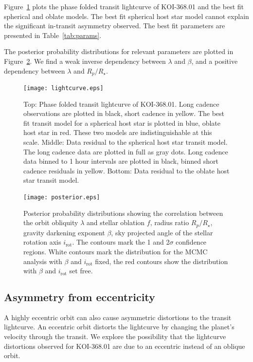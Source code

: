 \documentclass[apjl]{emulateapj}
\begin{document}
Figure~\ref{fig:lightcurve} plots the phase folded transit lightcurve of
KOI-368.01 and the best fit spherical and oblate models. The best fit
spherical host star model cannot explain the significant in-transit
asymmetry observed. The best fit parameters are presented in Table~\ref{tab:params}.

The posterior probability distributions for relevant parameters
are plotted in Figure~\ref{fig:posterior}. We find a weak inverse dependency
between $\lambda$ and $\beta$, and a positive dependency between
$\lambda$ and $R_p/R_\star$.



\begin{figure}[h!]
  \centering
  \texttt{[image: lightcurve.eps]}
  \caption{Top: Phase folded transit lightcurve of KOI-368.01. Long
    cadence observations are plotted in black, short cadence in
    yellow. The best fit transit model for a spherical host star is
    plotted in blue, oblate host star in red. These two models are
    indistinguishable at this scale. Middle: Data residual to the
    spherical host star transit model. The long cadence data are
    plotted in full as gray dots. Long cadence data binned to 1 hour
    intervals are plotted in black, binned short cadence residuals in yellow. Bottom:
    Data residual to the oblate host star transit model.}
  \label{fig:lightcurve}
\end{figure}

\begin{figure}[h!]
  \centering
  \texttt{[image: posterior.eps]}
  \caption{Posterior probability distributions showing the correlation
  between the orbit obliquity $\lambda$ and stellar oblation $f$,
  radius ratio $R_p/R_\star$, gravity darkening exponent $\beta$, sky
  projected angle of the stellar rotation axis $i_\text{rot}$. The
  contours mark the 1 and 2$\sigma$ confidence regions. White contours
mark the distribution for the MCMC analysis with $\beta$ and
$i_\text{rot}$ fixed, the red contours show the distribution with
$\beta$ and $i_\text{rot}$ set free.}
  \label{fig:posterior}
\end{figure}

\subsection{Asymmetry from eccentricity}
\label{sec:asymm-from-eccentr}

A highly eccentric orbit can also cause asymmetric distortions to the
transit lightcurve. An eccentric orbit distorts the lightcurve by
changing the planet's velocity through the transit. We explore the
possibility that the lightcurve distortions observed for KOI-368.01
are due to an eccentric instead of an oblique orbit.
\end{document}
